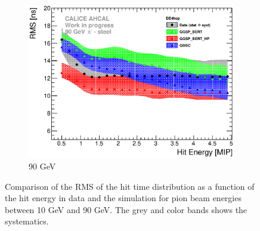 \begin{figure}[htbp!]
\begin{subfigure}[t]{0.49\textwidth}
    \centering
    \includegraphics[width=1\textwidth]{../Thesis_Plots/Timing/Pions/Plots/ComparisonToSim/RMS_Energy_90GeV_DD4hep.eps}
    \caption{90 GeV}\label{fig:Energy_RMS_SimData_90GeV_DD4hep}
  \end{subfigure}
  \caption{Comparison of the RMS of the hit time distribution as a function of the hit energy in data and the \ddhep simulation for pion beam energies between 10 GeV and 90 GeV. The grey and color bands shows the systematics.}
  \label{fig:Energy_RMS_SimData_Comparison_DD4hep}
\end{figure}


